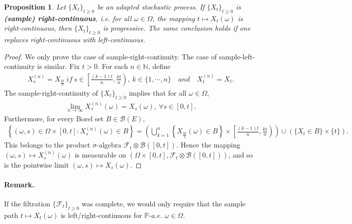 \documentclass{article}
\numberwithin{equation}{section}
\renewcommand{\P}{\mathbb{P}}
\theoremstyle{plain}
\newtheorem{proposition}[theorem]{Proposition}
\theoremstyle{definition}
\begin{document}
\begin{proposition}\label{prop:3.9} Let $\{X_t\}_{t\geq 0}$ be an adapted stochastic process. If $\{X_t\}_{t\geq 0}$ is \textbf{(sample) right-continuous}, i.e. for all $\omega\in\Omega$, the mapping $t\mapsto X_t(\omega)$ is right-continuous, then $\{X_t\}_{t\geq 0}$ is progressive. The same conclusion holds if one replaces right-continuous with left-continuous.
\end{proposition}
\begin{proof}
We only prove the case of sample-right-continuity. The case of sample-left-continuity is similar. Fix $t>0$. For each $n\in\mathbb{N}$, define
\begin{align*}
	X_s^{(n)} = X_{\frac{kt}{n}}\ \textit{if}\ s\in\left[\frac{(k-1)t}{n},\frac{kt}{n}\right),\ k\in\{1,\cdots,n\}\quad \textit{and}\quad X_t^{(n)}=X_t.
\end{align*}
The sample-right-continuity of $\{X_t\}_{t\geq 0}$ implies that for all $\omega\in\Omega$,
\begin{align*}
	\lim_{n\to\infty}X_s^{(n)}(\omega) = X_s(\omega),\ \forall s\in[0,t].
\end{align*}
Furthermore, for every Borel set $B\in\mathscr{B}(E)$,
\begin{align*}
	\left\{(\omega,s)\in\Omega\times[0,t]:X_s^{(n)}(\omega)\in B\right\} = \left(\bigcup_{k=1}^n\left\{X_{\frac{kt}{n}}(\omega)\in B\right\}\times\left[\frac{(k-1)t}{n},\frac{kt}{n}\right)\right)\cup\left(\{X_t\in B\}\times\{t\}\right).
\end{align*}
This belongs to the product $\sigma$-algebra $\mathscr{F}_t\otimes\mathscr{B}([0,t])$. Hence the mapping $(\omega,s)\mapsto X_s^{(n)}(\omega)$ is measurable on $(\Omega\times[0,t],\mathscr{F}_t\otimes\mathscr{B}([0,t]))$, and so is the pointwise limit $(\omega,s)\mapsto X_s(\omega)$.
\end{proof}

\paragraph{Remark.} If the filtration $\{\mathscr{F}_t\}_{t\geq 0}$ was complete, we would only require that the sample path $t\mapsto X_t(\omega)$ is left/right-continuous for $\P$-$a.e.$ $\omega\in\Omega$.
\end{document}
